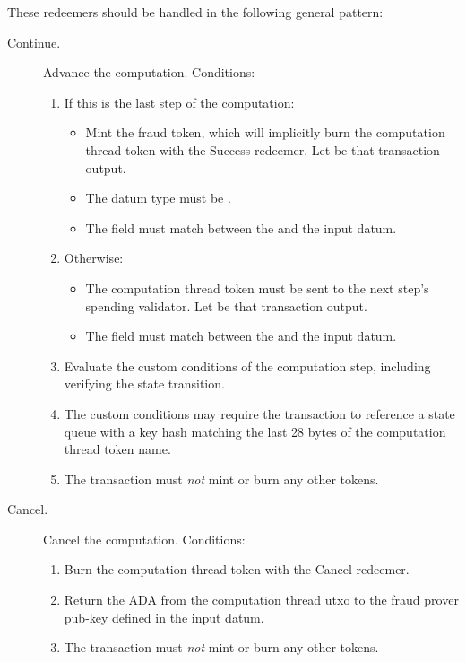 \documentclass[../midgard.tex]{subfiles}
\begin{document}
These redeemers should be handled in the following general pattern:
\begin{description}
    \item[Continue.] Advance the computation.
      Conditions:
        \begin{enumerate}
            \item If this is the last step of the computation:
                \begin{itemize}
                    \item Mint the fraud token, which will implicitly burn the computation thread token with the Success redeemer.
                      Let  be that transaction output.
                    \item The  datum type must be .
                    \item The  field must match between the  and the input datum.
                \end{itemize}
            \item Otherwise:
                \begin{itemize}
                    \item The computation thread token must be sent to the next step's spending validator.
                      Let  be that transaction output.
                    \item The  field must match between the  and the input datum.
                \end{itemize}
            \item Evaluate the custom conditions of the computation step, including verifying the state transition.
            \item The custom conditions may require the transaction to reference a state queue with a key hash matching the last 28 bytes of the computation thread token name.
            \item The transaction must \emph{not} mint or burn any other tokens.
        \end{enumerate}
    \item[Cancel.] Cancel the computation.
      Conditions:
        \begin{enumerate}
            \item Burn the computation thread token with the Cancel redeemer.
            \item Return the ADA from the computation thread utxo to the fraud prover pub-key defined in the input datum.
            \item The transaction must \emph{not} mint or burn any other tokens.
        \end{enumerate}
\end{description}
\end{document}
